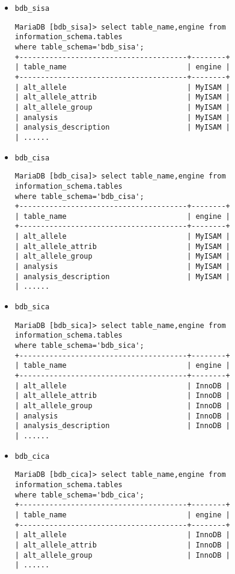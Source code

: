 \documentclass[12pt,a4paper]{article}
\begin{document}
\begin{itemize}
	\item \verb|bdb_sisa|
	\begin{verbatim}
MariaDB [bdb_sisa]> select table_name,engine from information_schema.tables 
where table_schema='bdb_sisa';
+---------------------------------------+--------+
| table_name                            | engine |
+---------------------------------------+--------+
| alt_allele                            | MyISAM |
| alt_allele_attrib                     | MyISAM |
| alt_allele_group                      | MyISAM |
| analysis                              | MyISAM |
| analysis_description                  | MyISAM |
| ......
	\end{verbatim}
	
	\item \verb|bdb_cisa|
	\begin{verbatim}
MariaDB [bdb_cisa]> select table_name,engine from information_schema.tables 
where table_schema='bdb_cisa';
+---------------------------------------+--------+
| table_name                            | engine |
+---------------------------------------+--------+
| alt_allele                            | MyISAM |
| alt_allele_attrib                     | MyISAM |
| alt_allele_group                      | MyISAM |
| analysis                              | MyISAM |
| analysis_description                  | MyISAM |
| ......
	\end{verbatim}
	
	\item \verb|bdb_sica|
	\begin{verbatim}
MariaDB [bdb_sica]> select table_name,engine from information_schema.tables 
where table_schema='bdb_sica';
+---------------------------------------+--------+
| table_name                            | engine |
+---------------------------------------+--------+
| alt_allele                            | InnoDB |
| alt_allele_attrib                     | InnoDB |
| alt_allele_group                      | InnoDB |
| analysis                              | InnoDB |
| analysis_description                  | InnoDB |
| ......
\end{verbatim}
	
	\item \verb|bdb_cica|
	\begin{verbatim}
MariaDB [bdb_cica]> select table_name,engine from information_schema.tables 
where table_schema='bdb_cica';
+---------------------------------------+--------+
| table_name                            | engine |
+---------------------------------------+--------+
| alt_allele                            | InnoDB |
| alt_allele_attrib                     | InnoDB |
| alt_allele_group                      | InnoDB |
| ......
	\end{verbatim}
	
	
\end{itemize}
\end{document}
